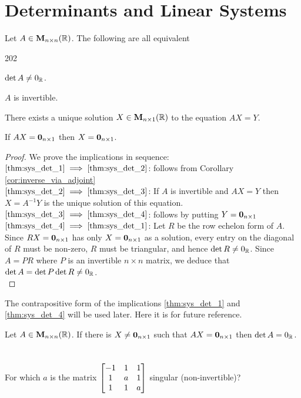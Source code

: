\section{Determinants and Linear Systems}
\begin{thm}\label{thm:systems_determinants_invertibility}Let
$A\in{\mathbf M}_{n\times n}( \mathbb{R})$. The following are all equivalent
\begin{dingautolist}{202}
\item \label{thm:sys_det_1} $\det A \neq 0_{\mathbb{R}}$. \item
\label{thm:sys_det_2}$A$ is invertible. \item\label{thm:sys_det_3}
There exists a unique solution $X\in{\mathbf M}_{n\times 1}( \mathbb{R})$ to the
equation $AX = Y$. \item  \label{thm:sys_det_4}If $AX = {\textbf 
0}_{n\times 1}$ then $X = {\textbf  0}_{n\times 1}$.
\end{dingautolist}\end{thm}
\begin{proof} We prove the implications in sequence: \\
$\ref{thm:sys_det_1} \implies \ref{thm:sys_det_2}$: follows from
Corollary \ref{cor:inverse_via_adjoint}\\ $\ref{thm:sys_det_2}
\implies \ref{thm:sys_det_3}$: If $A$ is invertible and $AX = Y$ then $X = A^{-1}Y$ is the unique solution of this equation.\\
$\ref{thm:sys_det_3} \implies \ref{thm:sys_det_4}$: follows by putting $Y = {\textbf  0}_{n\times 1}$\\
$\ref{thm:sys_det_4} \implies \ref{thm:sys_det_1}$: Let $R$ be the
row echelon form of $A$. Since $RX = {\textbf  0}_{n\times 1}$ has only
$X={\textbf  0}_{n\times 1}$ as a solution, every entry on the diagonal
of $R$ must be non-zero, $R$ must be triangular, and hence $\det R
\neq 0_{\mathbb{R}}$. Since $A = PR$ where $P$ is an invertible $n\times
n$ matrix,
we deduce that $\det A = \det P\det R  \neq 0_{\mathbb{R}}$.\\
\end{proof}
The contrapositive form of the implications \ref{thm:sys_det_1}
and \ref{thm:sys_det_4}  will be used later. Here it is for future
reference.
\begin{cor}\label{cor:0determinant_non_null_kernel}
Let $A\in{\mathbf M}_{n\times n}( \mathbb{R})$. If there is $X\neq {\textbf 
0}_{n\times 1}$ such that $AX = {\textbf  0}_{n\times 1}$ then $\det A =
0_{\mathbb{R}}$.
\end{cor}

\section*{}
\begin{pro}
For which $a$ is the matrix $\begin{bmatrix}-1 & 1 & 1 \cr 1 & a & 1
\cr 1 & 1 & a \cr \end{bmatrix}$ singular (non-invertible)?
\end{pro}
